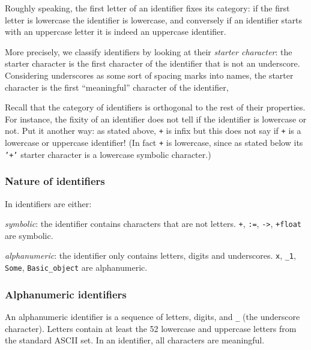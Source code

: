Roughly speaking, the first letter of an identifier fixes its category:
if the first letter is lowercase the identifier is lowercase, and conversely
if an identifier starts with an uppercase letter it is indeed an uppercase identifier.

More precisely, we classify identifiers by looking at their
{\em starter character}: the starter character is the first character of the identifier
that is not an underscore. Considering underscores as some sort of spacing
marks into names, the starter character is the first ``meaningful'' character
of the identifier,

Recall that the category of identifiers is orthogonal to the rest of their
properties. For instance, the fixity of an identifier does not tell if the
identifier is lowercase or not. Put it another way: as stated above, {\tt +}
is infix but this does not say if {\tt +} is a lowercase or uppercase
identifier! (In fact {\tt +} is lowercase, since as stated below its {\tt
  '+'} starter character is a lowercase symbolic character.)

\subsubsection{Nature of identifiers}

In {\focal} identifiers are either:

\begin{citemize}
\item {\em symbolic}: the identifier contains characters that are not
  letters. {\tt +}, {\tt :=}, {\tt ->}, {\tt +float} are symbolic.

\item {\em alphanumeric}: the identifier only contains letters, digits and
  underscores. {\tt x}, {\tt \_1}, {\tt Some}, {\tt Basic\_object} are
  alphanumeric.
\end{citemize}

\subsubsection{Alphanumeric identifiers}

An alphanumeric identifier is a sequence of letters, digits, and
{\tt \_} (the underscore character).
Letters contain at least the 52 lowercase and uppercase letters from the
standard ASCII set. In an identifier, all characters are meaningful.

